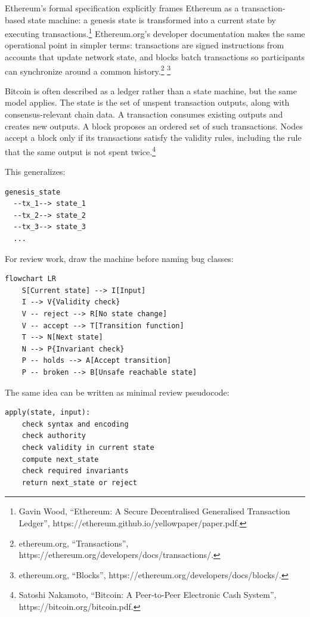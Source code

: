 Ethereum's formal specification explicitly frames Ethereum as a
transaction-based state machine: a genesis state is transformed into a
current state by executing transactions.\footnote{Gavin Wood,
  ``Ethereum: A Secure Decentralised Generalised Transaction Ledger'',
  https://ethereum.github.io/yellowpaper/paper.pdf.} Ethereum.org's
developer documentation makes the same operational point in simpler
terms: transactions are signed instructions from accounts that update
network state, and blocks batch transactions so participants can
synchronize around a common history.\footnote{ethereum.org,
  ``Transactions'', https://ethereum.org/developers/docs/transactions/.}
\footnote{ethereum.org, ``Blocks'',
  https://ethereum.org/developers/docs/blocks/.}

Bitcoin is often described as a ledger rather than a state machine, but
the same model applies. The state is the set of unspent transaction
outputs, along with consensus-relevant chain data. A transaction
consumes existing outputs and creates new outputs. A block proposes an
ordered set of such transactions. Nodes accept a block only if its
transactions satisfy the validity rules, including the rule that the
same output is not spent twice.\footnote{Satoshi Nakamoto, ``Bitcoin: A
  Peer-to-Peer Electronic Cash System'',
  https://bitcoin.org/bitcoin.pdf.}

This generalizes:

\begin{lstlisting}
genesis_state
  --tx_1--> state_1
  --tx_2--> state_2
  --tx_3--> state_3
  ...
\end{lstlisting}

For review work, draw the machine before naming bug classes:

\begin{lstlisting}
flowchart LR
    S[Current state] --> I[Input]
    I --> V{Validity check}
    V -- reject --> R[No state change]
    V -- accept --> T[Transition function]
    T --> N[Next state]
    N --> P{Invariant check}
    P -- holds --> A[Accept transition]
    P -- broken --> B[Unsafe reachable state]
\end{lstlisting}

The same idea can be written as minimal review pseudocode:

\begin{lstlisting}
apply(state, input):
    check syntax and encoding
    check authority
    check validity in current state
    compute next_state
    check required invariants
    return next_state or reject
\end{lstlisting}

